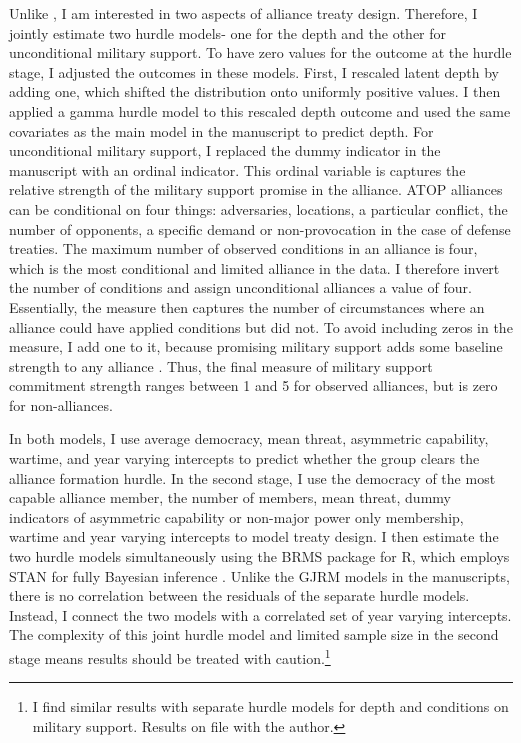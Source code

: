 \documentclass[12pt]{article}
\begin{document}
Unlike \citet{Chibaetal2015}, I am interested in two aspects of alliance treaty design. 
Therefore, I jointly estimate two hurdle models- one for the depth and the other for unconditional military support. 
To have zero values for the outcome at the hurdle stage, I adjusted the outcomes in these models. 
First, I rescaled latent depth by adding one, which shifted the distribution onto uniformly positive values. 
I then applied a gamma hurdle model to this rescaled depth outcome and used the same covariates as the main model in the manuscript to predict depth. 
For unconditional military support, I replaced the dummy indicator in the manuscript with an ordinal indicator.
This ordinal variable is captures the relative strength of the military support promise in the alliance. 
ATOP alliances can be conditional on four things: adversaries, locations, a particular conflict, the number of opponents, a specific demand or non-provocation in the case of defense treaties. 
The maximum number of observed conditions in an alliance is four, which is the most conditional and limited alliance in the data. 
I therefore invert the number of conditions and assign unconditional alliances a value of four. 
Essentially, the measure then captures the number of circumstances where an alliance could have applied conditions but did not. 
To avoid including zeros in the measure, I add one to it, because promising military support adds some baseline strength to any alliance \citep{Morrow2000}. 
Thus, the final measure of military support commitment strength ranges between 1 and 5 for observed alliances, but is zero for non-alliances. 


In both models, I use average democracy, mean threat, asymmetric capability, wartime, and year varying intercepts to predict whether the group clears the alliance formation hurdle.
In the second stage, I use the democracy of the most capable alliance member, the number of members, mean threat, dummy indicators of asymmetric capability or non-major power only membership, wartime and year varying intercepts to model treaty design. 
I then estimate the two hurdle models simultaneously using the BRMS package for R, which employs STAN for fully Bayesian inference \citep{Buerkner2017}. 
Unlike the GJRM models in the manuscripts, there is no correlation between the residuals of the separate hurdle models. Instead, I connect the two models with a correlated set of year varying intercepts. 
The complexity of this joint hurdle model and limited sample size in the second stage means results should be treated with caution.\footnote{I find similar results with separate hurdle models for depth and conditions on military support. Results on file with the author.} 
\end{document}
